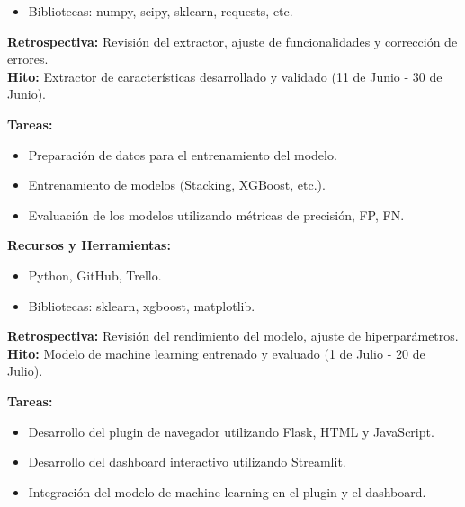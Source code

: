 \begin{tcolorbox}[phasebox, title=Fases del trabajo]
\begin{tcolorbox}[sprintbox, title= Sprint 2 y 3: Desarrollo del Extractor de Características.]
\begin{itemize}
            \item Bibliotecas: numpy, scipy, sklearn, requests, etc.

        \end{itemize}
        \textbf{Retrospectiva:} Revisión del extractor, ajuste de funcionalidades y corrección de errores.\\
        \textbf{Hito:} Extractor de características desarrollado y validado (11 de Junio - 30 de Junio).

    \end{tcolorbox}


    \begin{tcolorbox}[sprintbox, title= Sprint 4 a 6: Entrenamiento y Evaluación del Modelo de Machine Learning]
        \textbf{Tareas:}
        \begin{itemize}
            \item Preparación de datos para el entrenamiento del modelo.

            \item Entrenamiento de modelos (Stacking, XGBoost, etc.).

            \item Evaluación de los modelos utilizando métricas de precisión, FP, FN.

            
        \end{itemize}
        \textbf{Recursos y Herramientas:}
        \begin{itemize}
            \item Python, GitHub, Trello.
            \item Bibliotecas: sklearn, xgboost, matplotlib.

        \end{itemize}
        \textbf{Retrospectiva:} Revisión del rendimiento del modelo, ajuste de hiperparámetros.\\
        \textbf{Hito:} Modelo de machine learning entrenado y evaluado (1 de Julio - 20 de Julio).

    \end{tcolorbox}

    
    \begin{tcolorbox}[sprintbox, title= Sprint 7 y 8: Desarrollo del Plugin y el Dashboard]
        \textbf{Tareas:}
        \begin{itemize}
            \item Desarrollo del plugin de navegador utilizando Flask, HTML y JavaScript.
            \item Desarrollo del dashboard interactivo utilizando Streamlit.
            \item Integración del modelo de machine learning en el plugin y el dashboard.
        \end{itemize}
        

\end{tcolorbox}
\end{tcolorbox}
